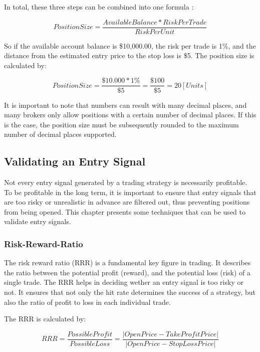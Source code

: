 In total, these three steps can be combined into one formula \cite{britannica-position-size}:

\begin{equation}
    PositionSize = \frac{Available Balance*RiskPerTrade}{RiskPerUnit}
\end{equation}

So if the available account balance is \$10,000.00, the risk per trade is 1\%, and the distance from the estimated entry price to the stop loss is \$5. The position size is calculated by:

\begin{equation}
    PositionSize = \frac{\$10.000*1\%}{\$5}=\frac{\$100}{\$5}=20 [Units]
\end{equation}

It is important to note that numbers can result with many decimal places, and many brokers only allow positions with a certain number of decimal places. If this is the case, the position size must be subsequently rounded to the maximum number of decimal places supported.

\subsection{Validating an Entry Signal}

Not every entry signal generated by a trading strategy is necessarily profitable. To be profitable in the long term, it is important to ensure that entry signals that are too risky or unrealistic in advance are filtered out, thus preventing positions from being opened. This chapter presents some techniques that can be used to validate entry signals.

\subsubsection{Risk-Reward-Ratio}

The risk reward ratio (RRR) is a fundamental key figure in trading. It describes the ratio between the potential profit (reward), and the potential loss (risk) of a single trade. The RRR helps in deciding wether an entry signal is too risky or not. It ensures that not only the hit rate determines the success of a strategy, but also the ratio of profit to loss in each individual trade.

The RRR is calculated by:

\begin{equation}
    RRR = \frac{PossibleProfit}{PossibleLoss} = \frac{|OpenPrice - TakeProfitPrice|}{|OpenPrice - StopLossPrice|}
\end{equation}

